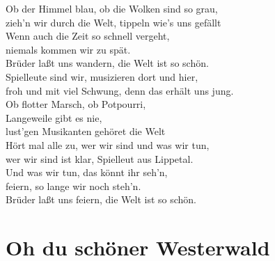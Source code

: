 \documentclass[twoside,8pt]{scrartcl}
\begin{document}
Ob der Himmel blau, ob die Wolken sind so grau,\\
zieh'n wir durch die Welt, tippeln wie's uns gefällt\\
Wenn auch die Zeit so schnell vergeht,\\
niemals kommen wir zu spät. \\
Brüder laßt uns wandern, die Welt ist so schön.\\
\newline
Spielleute sind wir, musizieren dort und hier,\\
froh und mit viel Schwung, denn das erhält uns jung.\\
Ob flotter Marsch, ob Potpourri,\\
Langeweile gibt es nie,\\
lust'gen Musikanten gehöret die Welt\\
\newline
Hört mal alle zu, wer wir sind und was wir tun,\\
wer wir sind ist klar, Spielleut aus Lippetal.\\
Und was wir tun, das könnt ihr seh'n,\\
feiern, so lange wir noch steh'n.\\
Brüder laßt uns feiern, die Welt ist so schön.\\

\clearpage
\section{Oh du schöner Westerwald}
\end{document}
